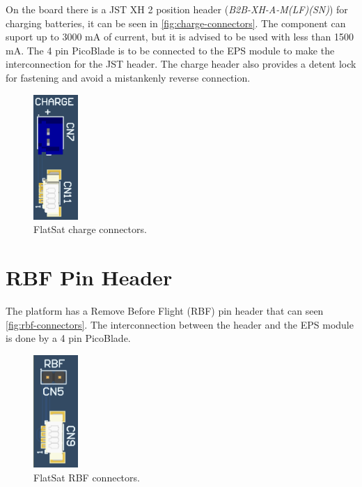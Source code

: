 On the board there is a JST XH 2 position header (\textit{B2B-XH-A-M(LF)(SN)}) for charging batteries, it can be seen in \autoref{fig:charge-connectors}. The component can suport up to 3000 mA of current, but it is advised to be used with less than 1500 mA. The 4 pin PicoBlade is to be connected to the EPS module to make the interconnection for the JST header. The charge header also provides a detent lock for fastening and avoid a mistankenly reverse connection.

\begin{figure}[!ht]
    \begin{center}
        \includegraphics[width=0.15\textwidth]{figures/charge_connectors.png}
        \caption{FlatSat charge connectors.}
        \label{fig:charge-connectors}
    \end{center}
\end{figure}

\section{RBF Pin Header}

The platform has a Remove Before Flight (RBF) pin header that can seen \autoref{fig:rbf-connectors}. The interconnection between the header and the EPS module is done by a 4 pin PicoBlade.

\begin{figure}[!ht]
    \begin{center}
        \includegraphics[width=0.15\textwidth]{figures/rbf_connectors.png}
        \caption{FlatSat RBF connectors.}
        \label{fig:rbf-connectors}
    \end{center}
\end{figure}

